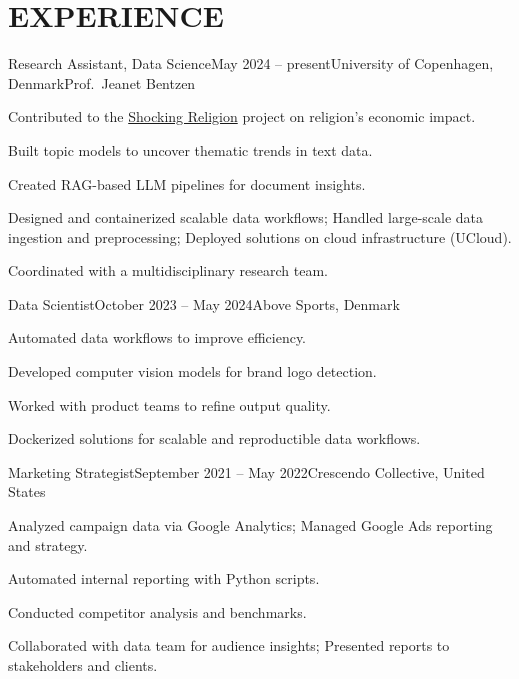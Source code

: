 \documentclass{resume}
\begin{document}
\section{EXPERIENCE}
\begin{content}

    \begin{position}{Research Assistant, Data Science}{May 2024 -- present}{University of Copenhagen, Denmark}{Prof.~Jeanet Bentzen}{}
        \item Contributed to the {\href{https://www.economics.ku.dk/research/externally-funded-research_new/shocking-religion/}{Shocking Religion}} project on religion's economic impact.
        \item Built topic models to uncover thematic trends in text data.
        \item Created RAG-based LLM pipelines for document insights.
        \item Designed and containerized scalable data workflows; Handled large-scale data ingestion and preprocessing; Deployed solutions on cloud infrastructure (UCloud).
        \item Coordinated with a multidisciplinary research team.
    \end{position}
    
    \begin{position}{Data Scientist}{October 2023 -- May 2024}{Above Sports, Denmark}{}{}
        \item Automated data workflows to improve efficiency.
        \item Developed computer vision models for brand logo detection.
        \item Worked with product teams to refine output quality.
        \item Dockerized solutions for scalable and reproductible data workflows.
    \end{position}
    
    \begin{position}{Marketing Strategist}{September 2021 -- May 2022}{Crescendo Collective, United States}{}{}
        \item Analyzed campaign data via Google Analytics; Managed Google Ads reporting and strategy.
        \item Automated internal reporting with Python scripts.
        \item Conducted competitor analysis and benchmarks.
        \item Collaborated with data team for audience insights; Presented reports to stakeholders and clients.
    \end{position}
    

\end{content}
\end{document}
